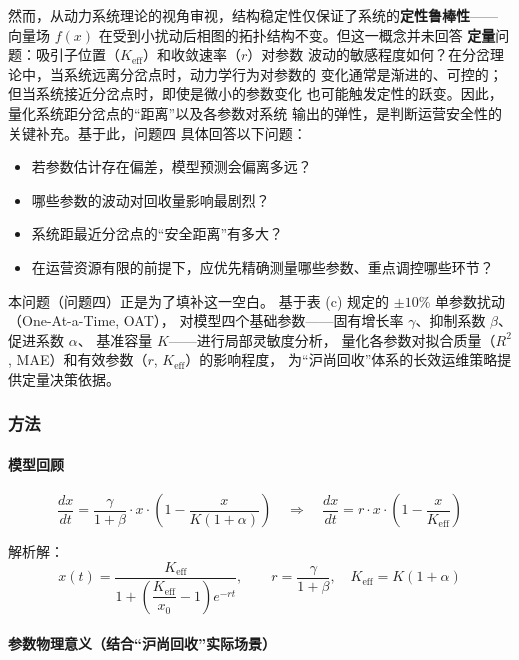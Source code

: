 \documentclass[12pt,a4paper]{ctexart}
\begin{document}
\begin{table}[htbp]
然而，从动力系统理论的视角审视，结构稳定性仅保证了系统的\textbf{定性鲁棒性}——
向量场 $f(x)$ 在受到小扰动后相图的拓扑结构不变。但这一概念并未回答
\textbf{定量}问题：吸引子位置（$K_{\text{eff}}$）和收敛速率（$r$）对参数
波动的敏感程度如何？在分岔理论中，当系统远离分岔点时，动力学行为对参数的
变化通常是渐进的、可控的；但当系统接近分岔点时，即使是微小的参数变化
也可能触发定性的跃变。因此，量化系统距分岔点的``距离''以及各参数对系统
输出的弹性，是判断运营安全性的关键补充。基于此，问题四 具体回答以下问题：
\begin{itemize}
  \item 若参数估计存在偏差，模型预测会偏离多远？
  \item 哪些参数的波动对回收量影响最剧烈？
  \item 系统距最近分岔点的``安全距离''有多大？
  \item 在运营资源有限的前提下，应优先精确测量哪些参数、重点调控哪些环节？
\end{itemize}

本问题（问题四）正是为了填补这一空白。
基于表 (c) 规定的 $\pm 10\%$ 单参数扰动（One-At-a-Time, OAT）\cite{saltelli}，
对模型四个基础参数——固有增长率 $\gamma$、抑制系数 $\beta$、促进系数 $\alpha$、
基准容量 $K$——进行局部灵敏度分析，
量化各参数对拟合质量（$R^2$, MAE）和有效参数（$r$, $K_{\text{eff}}$）的影响程度，
为``沪尚回收''体系的长效运维策略提供定量决策依据。

\subsubsection{方法}

\paragraph{模型回顾}

\begin{equation}\label{eq:ode_q4}
\frac{dx}{dt} = \frac{\gamma}{1+\beta} \cdot x \cdot \left(1 - \frac{x}{K(1+\alpha)}\right)
\quad\Rightarrow\quad
\frac{dx}{dt} = r \cdot x \cdot \left(1 - \frac{x}{K_{\text{eff}}}\right)
\end{equation}

解析解：
\begin{equation}\label{eq:solution_q4}
x(t) = \frac{K_{\text{eff}}}{1 + \left(\dfrac{K_{\text{eff}}}{x_0} - 1\right) e^{-r t}},\qquad
r = \frac{\gamma}{1+\beta},\quad K_{\text{eff}} = K(1+\alpha)
\end{equation}

\paragraph{参数物理意义（结合``沪尚回收''实际场景）}


\end{table}
\end{document}
